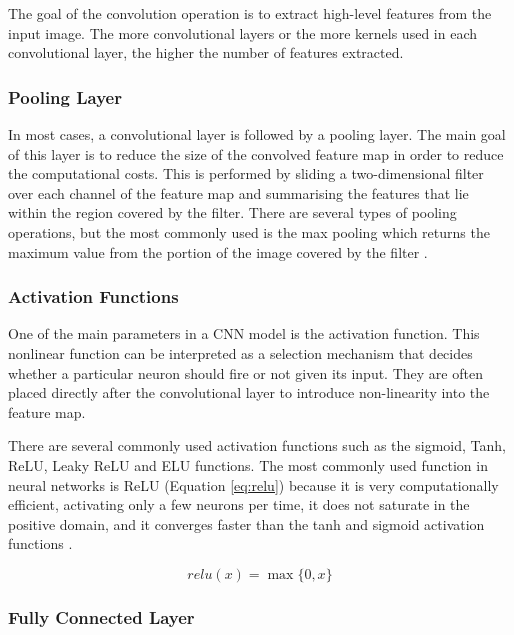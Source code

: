 The goal of the convolution operation is to extract high-level features from the input image. The more convolutional layers or the more kernels used in each convolutional layer, the higher the number of features extracted.



\subsubsection*{Pooling Layer}

In most cases, a convolutional layer is followed by a pooling layer. The main goal of this layer is to reduce the size of the convolved feature map in order to reduce the computational costs. This is performed by sliding a two-dimensional filter over each channel of the feature map and summarising the features that lie within the region covered by the filter. There are several types of pooling operations, but the most commonly used is the max pooling which returns the maximum value from the portion of the image covered by the filter \cite{2018guide}.

\subsubsection*{Activation Functions}

One of the main parameters in a \ac{CNN} model is the activation function. This nonlinear function can be interpreted as a selection mechanism that decides whether a particular neuron should fire or not given its input. They are often placed directly after the convolutional layer to introduce non-linearity into the feature map.

There are several commonly used activation functions such as the sigmoid, \ac{Tanh}, \ac{ReLU}, \ac{Leaky ReLU} and \ac{ELU} functions. The most commonly used function in neural networks is \ac{ReLU} (Equation \ref{eq:relu}) because it is very computationally efficient, activating only a few neurons per time, it does not saturate in the positive domain, and it converges faster than the tanh and sigmoid activation functions \cite{2018activation}.

\begin{equation}
    relu(x) = \max{\{0,x\}}
    \label{eq:relu}
\end{equation}

\subsubsection*{Fully Connected Layer}

